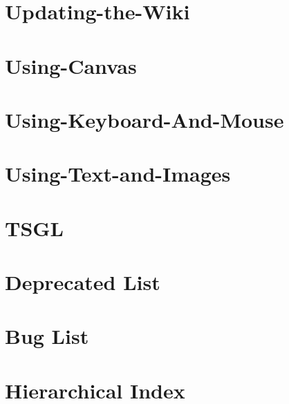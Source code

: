 \documentclass[twoside]{book}
\begin{document}
\chapter{Updating-\/the-\/\-Wiki}
\label{md__home_kodemonkey_workspace__t_s_g_l_docs-wiki__updating-the-_wiki}
\hypertarget{md__home_kodemonkey_workspace__t_s_g_l_docs-wiki__updating-the-_wiki}{}

\chapter{Using-\/\-Canvas}
\label{md__home_kodemonkey_workspace__t_s_g_l_docs-wiki__using-_canvas}
\hypertarget{md__home_kodemonkey_workspace__t_s_g_l_docs-wiki__using-_canvas}{}

\chapter{Using-\/\-Keyboard-\/\-And-\/\-Mouse}
\label{md__home_kodemonkey_workspace__t_s_g_l_docs-wiki__using-_keyboard-_and-_mouse}
\hypertarget{md__home_kodemonkey_workspace__t_s_g_l_docs-wiki__using-_keyboard-_and-_mouse}{}

\chapter{Using-\/\-Text-\/and-\/\-Images}
\label{md__home_kodemonkey_workspace__t_s_g_l_docs-wiki__using-_text-and-_images}
\hypertarget{md__home_kodemonkey_workspace__t_s_g_l_docs-wiki__using-_text-and-_images}{}

\chapter{T\-S\-G\-L}
\label{md__home_kodemonkey_workspace__t_s_g_l_readme}
\hypertarget{md__home_kodemonkey_workspace__t_s_g_l_readme}{}

\chapter{Deprecated List}
\label{deprecated}
\hypertarget{deprecated}{}

\chapter{Bug List}
\label{bug}
\hypertarget{bug}{}

\chapter{Hierarchical Index}

\end{document}
